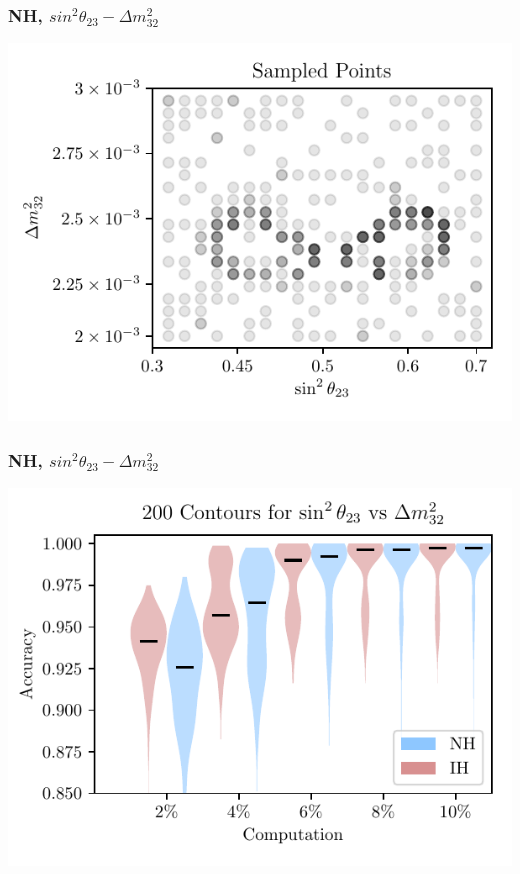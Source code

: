 \documentclass[9pt, aspectratio=169]{beamer}
\begin{document}
\begin{frame}
  \frametitle{NH, $sin^{2}\theta_{23}-\Delta m^{2}_{32}$}
  \centering
  \includegraphics[scale=0.75]{figures_final/sample_2d.pdf}
\end{frame}
\begin{frame}
  \frametitle{NH, $sin^{2}\theta_{23}-\Delta m^{2}_{32}$}
  \centering
  \includegraphics[scale=0.75]{figures_final/compare_contour.pdf}
\end{frame}
\end{document}
